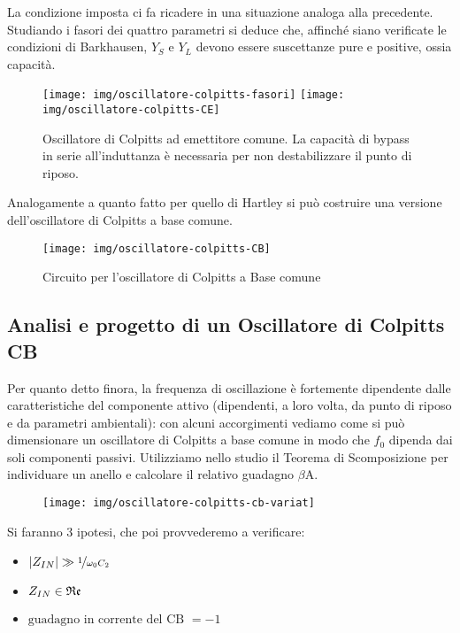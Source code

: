 La condizione imposta ci fa ricadere in una situazione analoga alla precedente. Studiando i fasori dei quattro parametri si deduce che, affinché siano verificate le condizioni di Barkhausen, $Y_S$ e $Y_L$ devono essere suscettanze pure e positive, ossia capacità.

\begin{figure}[tbh]
	\hspace{\fill}
	\texttt{[image: img/oscillatore-colpitts-fasori]}
	\hspace{\fill}
	\texttt{[image: img/oscillatore-colpitts-CE]}
	\hspace{\fill}
	\caption{Oscillatore di Colpitts ad emettitore comune. La capacità di bypass in serie all'induttanza è necessaria per non destabilizzare il punto di riposo.}
	\label{fig:oscillatore-colpitts-fasori}
\end{figure}

Analogamente a quanto fatto per quello di Hartley si può costruire una versione dell'oscillatore di
Colpitts a base comune.

\begin{figure}[tbh]
	\centering
	\texttt{[image: img/oscillatore-colpitts-CB]}
	\caption{Circuito per l'oscillatore di Colpitts a Base comune}
	\label{fig:oscillatore-colpitts-CB}
\end{figure}

\subsection{Analisi e progetto di un Oscillatore di Colpitts CB}

Per quanto detto finora, la frequenza di oscillazione è fortemente dipendente dalle caratteristiche del componente attivo (dipendenti, a loro volta, da punto di riposo e da parametri ambientali): con alcuni accorgimenti vediamo come si può dimensionare un oscillatore di Colpitts a base comune in modo che $f_0$ dipenda dai soli componenti passivi.
Utilizziamo nello studio il Teorema di Scomposizione per individuare un anello e calcolare il relativo guadagno $\beta$A.

\begin{figure}[htb]
	\centering
	\texttt{[image: img/oscillatore-colpitts-cb-variat]}
	\caption{}
	\label{fig:oscillatore-colpitts-cb-variat}
\end{figure}

Si faranno 3 ipotesi, che poi provvederemo a verificare:
\begin{itemize}
	\item $|Z_{IN}| \gg \nicefrac{1}{\omega_0 C_2}$
	\item $Z_{IN} \in \operatorname{\mathfrak{Re}}$
	\item $\mbox{guadagno in corrente del CB } = -1$
\end{itemize}


